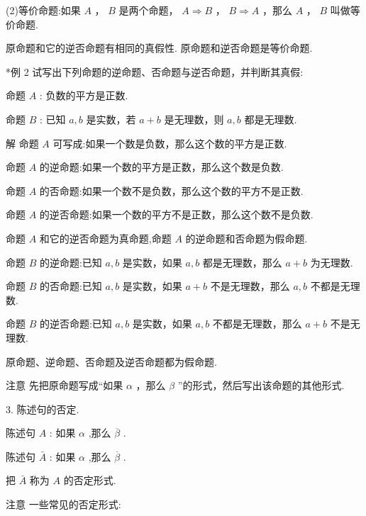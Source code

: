 \documentclass[10pt]{article}
\begin{document}
(2)等价命题:如果 \(A\) ， \(B\) 是两个命题， \(A \Rightarrow  B\) ， \(B \Rightarrow  A\) ，那么 \(A\) ， \(B\) 叫做等价命题.

原命题和它的逆否命题有相同的真假性. 原命题和逆否命题是等价命题.

*例 2 试写出下列命题的逆命题、否命题与逆否命题，并判断其真假:

命题 \(A\) : 负数的平方是正数.

命题 \(B\) : 已知 \(a,b\) 是实数，若 \(a + b\) 是无理数，则 \(a,b\) 都是无理数.

解 命题 \(A\) 可写成:如果一个数是负数，那么这个数的平方是正数.

命题 \(A\) 的逆命题:如果一个数的平方是正数，那么这个数是负数.

命题 \(A\) 的否命题:如果一个数不是负数，那么这个数的平方不是正数.

命题 \(A\) 的逆否命题:如果一个数的平方不是正数，那么这个数不是负数.

命题 \(A\) 和它的逆否命题为真命题,命题 \(A\) 的逆命题和否命题为假命题.

命题 \(B\) 的逆命题:已知 \(a,b\) 是实数，如果 \(a,b\) 都是无理数，那么 \(a + b\) 为无理数.

命题 \(B\) 的否命题:已知 \(a,b\) 是实数，如果 \(a + b\) 不是无理数，那么 \(a,b\) 不都是无理数.

命题 \(B\) 的逆否命题:已知 \(a,b\) 是实数，如果 \(a,b\) 不都是无理数，那么 \(a + b\) 不是无理数.

原命题、逆命题、否命题及逆否命题都为假命题.

注意 先把原命题写成“如果 \(\alpha\) ，那么 \(\beta\) ”的形式，然后写出该命题的其他形式.

3. 陈述句的否定.

陈述句 \(A\) : 如果 \(\alpha\) ,那么 \(\overline{\beta }\) .

陈述句 \(\bar{A}\) : 如果 \(\alpha\) ,那么 \(\overline{\beta }\) .

把 \(\bar{A}\) 称为 \(A\) 的否定形式.

注意 一些常见的否定形式:

\begin{center}
\end{center}
\end{document}
